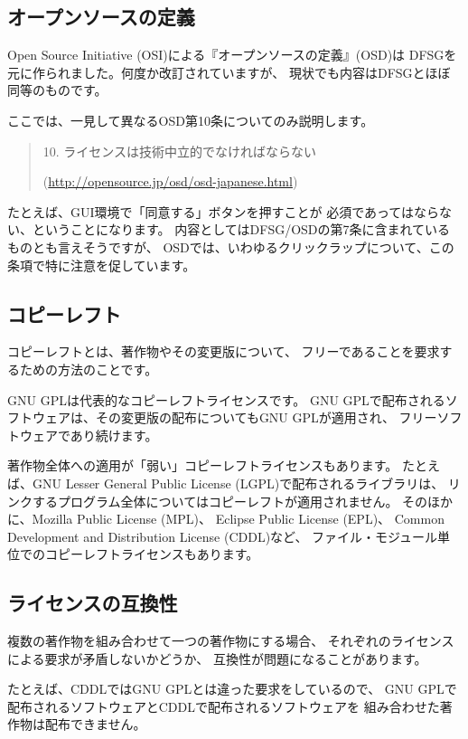 \documentclass[mingoth,a4paper]{jsarticle}
\begin{document}
\subsection{オープンソースの定義}
Open Source Initiative (OSI)による『オープンソースの定義』(OSD)は
DFSGを元に作られました。何度か改訂されていますが、
現状でも内容はDFSGとほぼ同等のものです。

ここでは、一見して異なるOSD第10条についてのみ説明します。

\begin{quote}
10. ライセンスは技術中立的でなければならない

(\url{http://opensource.jp/osd/osd-japanese.html})
\end{quote}

たとえば、GUI環境で「同意する」ボタンを押すことが
必須であってはならない、ということになります。
内容としてはDFSG/OSDの第7条に含まれているものとも言えそうですが、
OSDでは、いわゆるクリックラップについて、この条項で特に注意を促しています。

\subsection{コピーレフト}

コピーレフトとは、著作物やその変更版について、
フリーであることを要求するための方法のことです。

GNU GPLは代表的なコピーレフトライセンスです。
GNU GPLで配布されるソフトウェアは、その変更版の配布についてもGNU GPLが適用され、
フリーソフトウェアであり続けます。

著作物全体への適用が「弱い」コピーレフトライセンスもあります。
たとえば、GNU Lesser General Public License (LGPL)で配布されるライブラリは、
リンクするプログラム全体についてはコピーレフトが適用されません。
そのほかに、Mozilla Public License (MPL)、
Eclipse Public License (EPL)、
Common Development and Distribution License (CDDL)など、
ファイル・モジュール単位でのコピーレフトライセンスもあります。

\subsection{ライセンスの互換性}

複数の著作物を組み合わせて一つの著作物にする場合、
それぞれのライセンスによる要求が矛盾しないかどうか、
互換性が問題になることがあります。

たとえば、CDDLではGNU GPLとは違った要求をしているので、
GNU GPLで配布されるソフトウェアとCDDLで配布されるソフトウェアを
組み合わせた著作物は配布できません。
\end{document}

